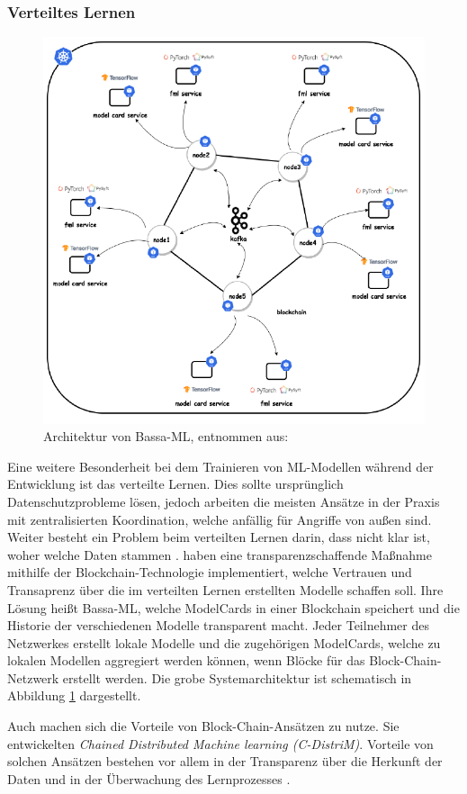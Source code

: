 \subsubsection{Verteiltes Lernen}
\begin{figure}[h]
    \centering
    \includegraphics[scale=0.45]{pic/MA-Bilder/Literaturrecherche/56-BassaMLArchitektur.PNG}
    \caption{Architektur von Bassa-ML, entnommen aus: \cite{bandara2022bassa}}
    \label{Fig:Bass-ML-Architektur}
\end{figure}
Eine weitere Besonderheit bei dem Trainieren von ML-Modellen während der Entwicklung ist das verteilte Lernen. Dies sollte ursprünglich Datenschutzprobleme lösen, jedoch arbeiten die meisten Ansätze in der Praxis mit zentralisierten Koordination, welche anfällig für Angriffe von außen sind. Weiter besteht ein Problem beim verteilten Lernen darin, dass nicht klar ist, woher welche Daten stammen \cite{bandara2022bassa}.
\cite{bandara2022bassa} haben eine transparenzschaffende Maßnahme mithilfe der Blockchain-Technologie implementiert, welche Vertrauen und Transaprenz über die im verteilten Lernen erstellten Modelle schaffen soll. Ihre Lösung heißt Bassa-ML, welche ModelCards in einer Blockchain speichert und die Historie der verschiedenen Modelle transparent macht. Jeder Teilnehmer des Netzwerkes erstellt lokale Modelle und die zugehörigen ModelCards, welche zu lokalen Modellen aggregiert werden können, wenn Blöcke für das Block-Chain-Netzwerk erstellt werden. Die grobe Systemarchitektur ist schematisch in Abbildung \ref{Fig:Bass-ML-Architektur} dargestellt.

Auch \cite{zerka2020blockchain} machen sich die Vorteile von Block-Chain-Ansätzen zu nutze. Sie entwickelten \emph{Chained Distributed Machine learning (C-DistriM)}. Vorteile von solchen Ansätzen bestehen vor allem in der Transparenz über die Herkunft der Daten und in der Überwachung des Lernprozesses \cite{zerka2020blockchain}.